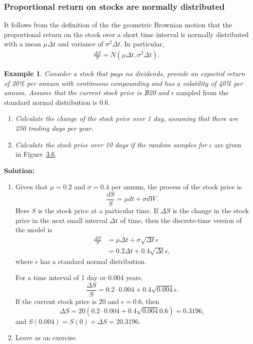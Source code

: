 \documentclass[
]{book}
\theoremstyle{definition}
\theoremstyle{definition}
\newtheorem{example}{Example}[chapter]
\theoremstyle{definition}
\theoremstyle{definition}
\theoremstyle{remark}
\begin{document}
\hypertarget{proportional-return-on-stocks-are-normally-distributed}{%
\subsubsection{Proportional return on stocks are normally distributed}\label{proportional-return-on-stocks-are-normally-distributed}}

It follows from the definition of the the geometric Brownian motion that
the proportional return on the stock over a short time interval is
normally distributed with a mean \(\mu \Delta t\) and variance of
\(\sigma^2 \Delta t\). In particular, \[\begin{aligned}
\label{propReturn}
\frac{\Delta S}{S} = N( \mu \Delta t , \sigma^2  \Delta t).\end{aligned}\]

\begin{example}

\emph{Consider a stock that pays no dividends, provide an expected return of
20\% per annum with continuous compounding and has a volatility of 40\%
per annum. Assume that the current stock price is ฿20 and} \(\epsilon\)
sampled from the standard normal distribution is 0.6.

\begin{enumerate}
\def\labelenumi{\arabic{enumi}.}
\item
  \emph{Calculate the change of the stock price over 1 day, assuming that
  there are 250 trading days per year.}
\item
  \emph{Calculate the stock price over 10 days if the random samples for}
  \(\epsilon\) are given in Figure~\protect\hyperlink{fig:GBM}{3.6}.
\end{enumerate}

\end{example}

\textbf{Solution:}

\begin{enumerate}
\def\labelenumi{\arabic{enumi}.}
\item
  Given that \(\mu = 0.2\) and \(\sigma = 0.4\) per annum, the process of
  the stock price is \[\frac{dS}{S} = \mu dt + \sigma dW.\] Here \(S\)
  is the stock price at a particular time. If \(\Delta S\) is the change
  in the stock price in the next small interval \(\Delta\)t of time,
  then the discrete-time version of the model is \[\begin{aligned}
      \frac{\Delta S}{S} &= \mu \Delta t + \sigma \sqrt{\Delta t} \epsilon \\
                     &= 0.2 \Delta t + 0.4 \sqrt{\Delta t} \epsilon,
      \end{aligned}\] where \(\epsilon\) has a standard normal
  distribution.

  For a time interval of 1 day or 0.004 years,
  \[\frac{\Delta S}{S} = 0.2 \cdot 0.004 + 0.4 \sqrt{0.004} \epsilon.\]
  If the current stock price is 20 and \(\epsilon = 0.6\), then
  \[\Delta S = 20(0.2 \cdot 0.004 + 0.4 \sqrt{0.004} 0.6) = 0.3196,\]
  and \(S(0.004) = S(0) + \Delta S = 20.3196.\)
\item
  Leave as an exercise.
\end{enumerate}
\end{document}
